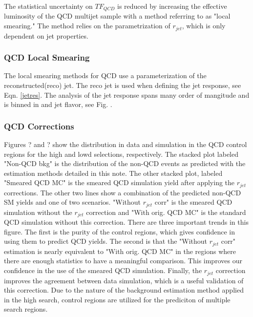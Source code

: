 The statistical uncertainty on $TF_{QCD}$ is reduced by increasing the effective luminosity of the QCD multijet sample with a method referring to as "local smearing." The method relies on the parametrization of $r_{jet}$, which is only dependent on jet properties.

\subsubsection{QCD Local Smearing}\label{Smearing}
The local smearing methods for QCD use a parameterization of the reconstructed(reco) jet. The reco jet is used when defining the jet response, see Eqn. \ref{jetres}. The analysis of the jet response spans many order of mangitude and is binned in \pt{} and jet flavor, see Fig. \label{jetRes}. 


\subsubsection{QCD Corrections}

Figures ? and ? show the \met{} distribution in data and simulation in the QCD control regions for the high \dm{} and lowd \dm{} selections, respectively. The stacked plot labeled "Non-QCD bkg" is the distribution of the non-QCD events as predicted with the estimation methods detailed in this note. The other stacked plot, labeled "Smeared QCD MC" is the smeared QCD simulation yield after applying the $r_{jet}$ corrections. The other two lines show a combination of the predicted non-QCD SM yields and one of two scenarios. "Without $r_{jet}$ corr" is the smeared QCD simulation without the $r_{jet}$ correction and "With orig. QCD MC" is the standard QCD simulation without this correction. There are three important trends in this figure. The first is the purity of the control regions, which gives confidence in using them to predict QCD yields. The second is that the "Without $r_{jet}$ corr" estimation is nearly equivalent to "With orig. QCD MC" in the regions where there are enough statistics to have a meaningful comparison. This improves our confidence in the use of the smeared QCD simulation. Finally, the $r_{jet}$ correction improves the agreement between data simulation, which is a useful validation of this correction. Due to the nature of the background estimation method applied in the high \dm{} search, control regions are utilized for the prediciton of multiple search regions. 

